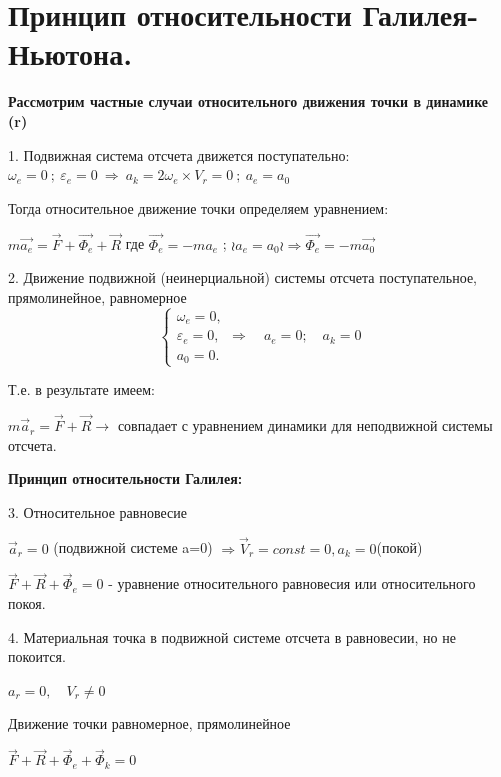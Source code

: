 {\section{Принцип относительности Галилея-Ньютона.}
\begin{center}
    \par \textbf{Рассмотрим частные случаи относительного движения точки в динамике (r)}
    \par {1.} Подвижная система отсчета движется поступательно: ${\omega_e}=0 \ ; \ {\varepsilon_e}=0 \ {\Rightarrow} \ {a_k}= 2{\omega_e}\times{V_r}=0\ ; \ {a_e}={a_0} $
    \par Тогда относительное движение точки определяем уравнением: 
    \par $ m\vec{a_e}=\vec{F}+\vec{\Phi_e}+\vec{R}$ \quad где \quad $\vec{\Phi_e}=-m{a_e}$ ; $ \wr{a_e}={a_0}\wr \Rightarrow \vec{\Phi_e}=-m\vec{a_0} $
     \par {2.} Движение подвижной (неинерциальной) системы отсчета поступательное, прямолинейное, равномерное 
        \begin{equation*}
         \begin{cases}
           {\omega_e=0} , 
           \\
           {\varepsilon_e=0},
           \\
           {a_0=0}.
         \end{cases}
        \Rightarrow \quad {a_e}=0; \quad {a_k}=0
        \end{equation*}
    \par Т.е. в результате имеем:  
    \par $m\vec{a}_r = \vec{F}+\vec{R} \rightarrow$ совпадает с уравнением динамики для неподвижной системы отсчета.  
    \par \textbf{Принцип относительности Галилея:}
    \par {}
    \par {3.} Относительное равновесие 
    \par $\vec{a}_r=0$ (подвижной системе a=0) $\Rightarrow \vec{V}_r=const=0, a_k=0$(покой)
    \par $\vec{F}+\vec{R}+\vec{\Phi}_e=0$ - уравнение относительного равновесия или относительного покоя.
    \par {4.} Материальная точка в подвижной системе отсчета в равновесии, но не покоится.
    \par $a_r=0, \quad V_r \neq 0$
    \par Движение точки равномерное, прямолинейное
    \par $\vec{F}+\vec{R}+\vec{\Phi}_e+\vec{\Phi}_k=0$
\end{center}
}
